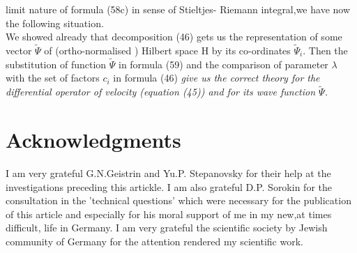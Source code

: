 \documentclass[a4paper,12pt] {article}
\begin{document}
 limit nature of formula (58c) in sense of  Stieltjes- Riemann  integral,we have now the following
situation. \\ We showed already that decomposition (46) gets us the representation of some vector
 $\tilde \Psi$  of (ortho-normalised ) Hilbert space H
by its co-ordinates $ \tilde\Psi_i$. Then the substitution of function $\tilde\Psi$  in  formula   (59) and
the comparison of parameter  $ \lambda$  with the set of factors $c_i $ in formula (46)  \it  give  us the
 correct theory for the differential operator of velocity \rm (equation (45))  \it and for its wave function
\rm $\tilde \Psi$.
 \section *{Acknowledgments} I am very grateful G.N.Geistrin and Yu.P. Stepanovsky for their help at
 the investigations preceding this artickle.
I am also grateful D.P. Sorokin for the consultation in the 'technical questions' which were
 necessary for the publication of this article and especially for his moral support of me in my new,at
times difficult, life in Germany.
I am very grateful the scientific society by Jewish community of Germany for the attention rendered my
scientific work.
\end{document}
